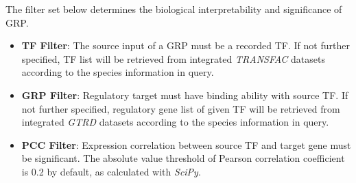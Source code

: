 \documentclass[fleqn,10pt]{wlscirep}
\begin{document}
\begin{enumerate}
The filter set below determines the biological interpretability and significance of GRP. 
\begin{itemize}
\setlength\itemsep{0em}
\item \textbf{TF Filter}: The source input of a GRP must be a recorded TF.
If not further specified, TF list will be retrieved from integrated \emph{TRANSFAC}\cite{transfac} datasets according to the species information in query.
\item \textbf{GRP Filter}: Regulatory target must have binding ability with source TF. If not further specified, regulatory gene list of given TF will be retrieved from integrated \emph{GTRD}\cite{gkaa1057} datasets according to the species information in query.
\item \textbf{PCC Filter}: Expression correlation between source TF and target gene must be significant. The absolute value threshold  of Pearson correlation coefficient is 0.2 by default, as calculated with \emph{SciPy}\cite{2020SciPy-NMeth}.
\end{itemize}
\end{enumerate}

\end{document}
